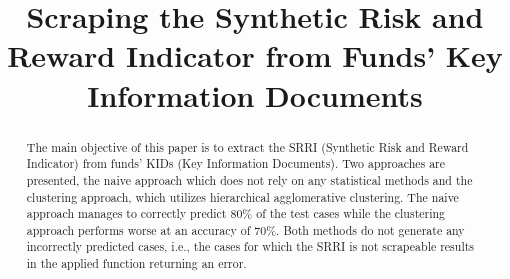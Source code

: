 \documentclass[aodsor,preprint]{imsart}
\numberwithin{equation}{section}
\theoremstyle{plain}
\begin{document}
\begin{frontmatter}
\title{Scraping the Synthetic Risk and Reward Indicator from Funds' Key Information Documents}

\begin{aug}
\author{ }





\end{aug}

\begin{abstract}
The main objective of this paper is to extract the SRRI (Synthetic Risk and Reward Indicator) from funds' KIDs (Key Information Documents). Two approaches are presented, the naive approach which does not rely on any statistical methods and the clustering approach, which utilizes hierarchical agglomerative clustering. The naive approach manages to correctly predict 80\% of the test cases while the clustering approach performs worse at an accuracy of 70\%. Both methods do not generate any incorrectly predicted cases, i.e., the cases for which the SRRI is not scrapeable results in the applied function returning an error. 
\end{abstract}

\begin{keyword}[class=MSC]
\end{keyword}

\begin{keyword}
\kwd{\LaTeXe}
\end{keyword}

\end{frontmatter}
\end{document}
